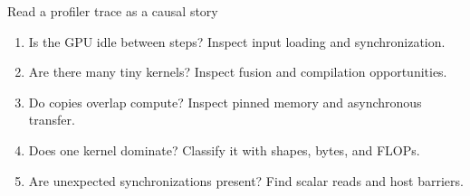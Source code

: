 \documentclass[handout]{beamer}
\begin{document}
\begin{frame}{Read a profiler trace as a causal story}
  \begin{enumerate}
      \setlength{\itemsep}{7pt}
    \item Is the GPU idle between steps? Inspect input loading and synchronization.
    \item Are there many tiny kernels? Inspect fusion and compilation opportunities.
    \item Do copies overlap compute? Inspect pinned memory and asynchronous transfer.
    \item Does one kernel dominate? Classify it with shapes, bytes, and FLOPs.
    \item Are unexpected synchronizations present? Find scalar reads and host barriers.
  \end{enumerate}
\end{frame}
\end{document}
